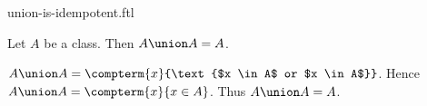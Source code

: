 \documentclass{article}
\begin{document}
\begin{smodule}[creators={Marcel Schütz}]{union-is-idempotent.ftl}

  \begin{fproposition*}[label=6505712620404736]
    Let $A$ be a class.
    Then $A \union A = A$.
  \end{fproposition*}
  \begin{fproof}
    $A \union A = \compterm{x}{\text{$x \in A$ or $x \in A$}}$.
    Hence $A \union A = \compterm{x}{x \in A}$.
    Thus $A \union A = A$.
  \end{fproof}
\end{smodule}
\end{document}
